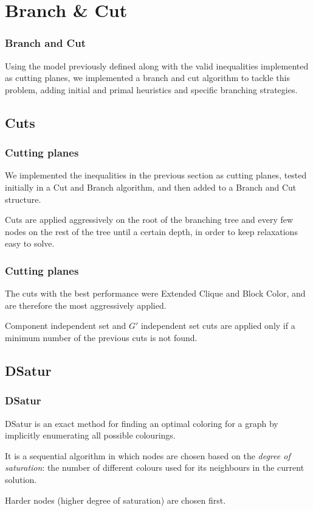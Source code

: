 \documentclass{beamer}
\begin{document}
\section{Branch \& Cut}

\begin{frame}
\frametitle{Branch and Cut}

Using the model previously defined along with the valid inequalities implemented as cutting planes, we implemented a branch and cut algorithm to tackle this problem, adding initial and primal heuristics and specific branching strategies.

\end{frame} 

\subsection{Cuts}

\begin{frame}
\frametitle{Cutting planes}

We implemented the inequalities in the previous section as cutting planes, tested initially in a Cut and Branch algorithm, and then added to a Branch and Cut structure.

Cuts are applied aggressively on the root of the branching tree and every few nodes on the rest of the tree until a certain depth, in order to keep relaxations easy to solve.

\end{frame}

\begin{frame}
\frametitle{Cutting planes}

The cuts with the best performance were Extended Clique and Block Color, and are therefore the most aggressively applied. 

Component independent set and $G'$ independent set cuts are applied only if a minimum number of the previous cuts is not found.

\end{frame}

\subsection{DSatur}
\begin{frame}
\frametitle{DSatur}

DSatur is an exact method for finding an optimal coloring for a graph by implicitly enumerating all possible colourings.

It is a sequential algorithm in which nodes are chosen based on the \textit{degree of saturation}: the number of different colours used for its neighbours in the current solution. 

Harder nodes (higher 
degree of saturation) are chosen first.

\end{frame} 
\end{document}
